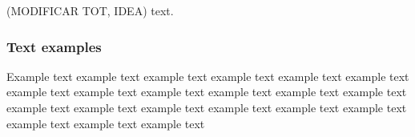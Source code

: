 (MODIFICAR TOT, IDEA) text.\\





\subsubsection{Text examples}
Example text example text example text example text example text example text example text
example text example text example text example text example text example text example text
example text example text example text example text example text example text example text


\pagebreak